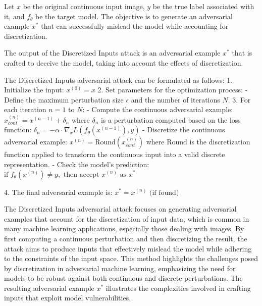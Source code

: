 Let $x$ be the original continuous input image, $y$ be the true label associated with it, and $f_{\theta}$ be the target model. The objective is to generate an adversarial example $x^*$ that can successfully mislead the model while accounting for discretization.

The output of the Discretized Inputs attack is an adversarial example $x^*$ that is crafted to deceive the model, taking into account the effects of discretization.

The Discretized Inputs adversarial attack can be formulated as follows:
1. Initialize the input:
   $x^{(0)} = x$
2. Set parameters for the optimization process:
   - Define the maximum perturbation size $\epsilon$ and the number of iterations $N$.
3. For each iteration $n = 1$ to $N$:
   - Compute the continuous adversarial example:
   $x_{cont}^{(n)} = x^{(n-1)} + \delta_n$
   where $\delta_n$ is a perturbation computed based on the loss function:
   $\delta_n = -\alpha \cdot \nabla_x L(f_{\theta}(x^{(n-1)}), y)$
   - Discretize the continuous adversarial example:
   $x^{(n)} = \text{Round}(x_{cont}^{(n)})$
   where $\text{Round}$ is the discretization function applied to transform the continuous input into a valid discrete representation.
   - Check the model's prediction:
   $\text{if } f_{\theta}(x^{(n)}) \neq y, \text{ then accept } x^{(n)} \text{ as } x^*$

4. The final adversarial example is:
   $x^* = x^{(n)} \text{ (if found)}$

The Discretized Inputs adversarial attack focuses on generating adversarial examples that account for the discretization of input data, which is common in many machine learning applications, especially those dealing with images. By first computing a continuous perturbation and then discretizing the result, the attack aims to produce inputs that effectively mislead the model while adhering to the constraints of the input space. This method highlights the challenges posed by discretization in adversarial machine learning, emphasizing the need for models to be robust against both continuous and discrete perturbations. The resulting adversarial example $x^*$ illustrates the complexities involved in crafting inputs that exploit model vulnerabilities.
